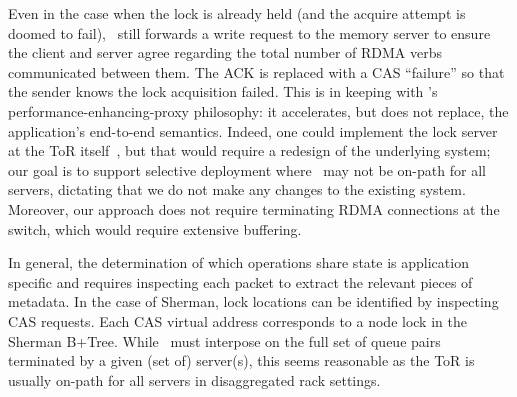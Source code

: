 Even in the case when the lock is already held (and the acquire attempt
is doomed to fail), \sword\ still forwards a write request to the
memory server to ensure the client and server agree regarding the
total number of RDMA verbs communicated between them.  The ACK
is replaced with a CAS ``failure'' so that the sender knows the lock
acquisition failed.  This is in keeping with \sword's
performance-enhancing-proxy philosophy: it accelerates, but does not
replace, the application's end-to-end semantics.
Indeed, one could implement the lock server at the ToR
itself~\cite{netlock}, but that would require a redesign of the
underlying system; our goal is to support selective deployment where
\sword\ may not be on-path for all servers, dictating that we do not
make any changes to the existing system.  Moreover, our approach does
not require terminating RDMA connections at the switch, which would
require extensive buffering.






In
general, the determination of which operations share state is application
specific and requires inspecting each packet to extract the relevant pieces
of metadata. In the case of Sherman, lock locations can be identified by
inspecting CAS requests. Each CAS virtual address corresponds to a node lock in
the Sherman B+Tree.
While \sword\ must interpose on the full set of queue pairs terminated
by a given (set of) server(s),
this seems reasonable as the ToR is usually on-path for all servers in disaggregated rack settings.

